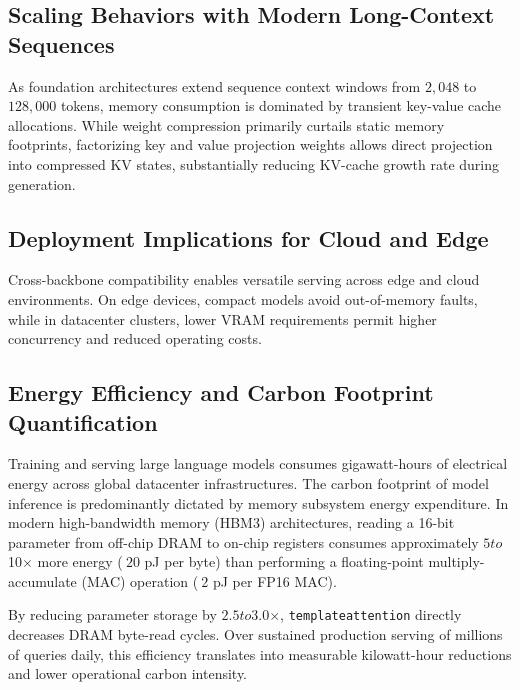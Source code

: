 \subsection{Scaling Behaviors with Modern Long-Context Sequences}
As foundation architectures extend sequence context windows from $2{,}048$ to $128{,}000$ tokens, memory consumption is dominated by transient key-value cache allocations. While weight compression primarily curtails static memory footprints, factorizing key and value projection weights allows direct projection into compressed KV states, substantially reducing KV-cache growth rate during generation.

\subsection{Deployment Implications for Cloud and Edge}
Cross-backbone compatibility enables versatile serving across edge and cloud environments. On edge devices, compact models avoid out-of-memory faults, while in datacenter clusters, lower VRAM requirements permit higher concurrency and reduced operating costs.

\subsection{Energy Efficiency and Carbon Footprint Quantification}
Training and serving large language models consumes gigawatt-hours of electrical energy across global datacenter infrastructures. The carbon footprint of model inference is predominantly dictated by memory subsystem energy expenditure. In modern high-bandwidth memory (HBM3) architectures, reading a 16-bit parameter from off-chip DRAM to on-chip registers consumes approximately $5$\times$ to $10$\times$ more energy ($~20$ pJ per byte) than performing a floating-point multiply-accumulate (MAC) operation ($~2$ pJ per FP16 MAC).

By reducing parameter storage by $2.5$\times$ to $3.0$\times$, \texttt{templateattention} directly decreases DRAM byte-read cycles. Over sustained production serving of millions of queries daily, this efficiency translates into measurable kilowatt-hour reductions and lower operational carbon intensity.
